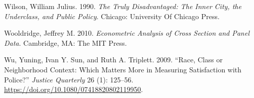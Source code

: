 \documentclass[12pt,]{article}
\begin{document}
\leavevmode\hypertarget{ref-Wilson1990}{}%
Wilson, William Julius. 1990. \emph{The Truly Disadvantaged: The Inner City, the Underclass, and Public Policy}. Chicago: University Of Chicago Press.

\leavevmode\hypertarget{ref-Wooldridge2010}{}%
Wooldridge, Jeffrey M. 2010. \emph{Econometric Analysis of Cross Section and Panel Data}. Cambridge, MA: The MIT Press.

\leavevmode\hypertarget{ref-Wu2009}{}%
Wu, Yuning, Ivan Y. Sun, and Ruth A. Triplett. 2009. ``Race, Class or Neighborhood Context: Which Matters More in Measuring Satisfaction with Police?'' \emph{Justice Quarterly} 26 (1): 125--56. \url{https://doi.org/10.1080/07418820802119950}.
\end{document}
